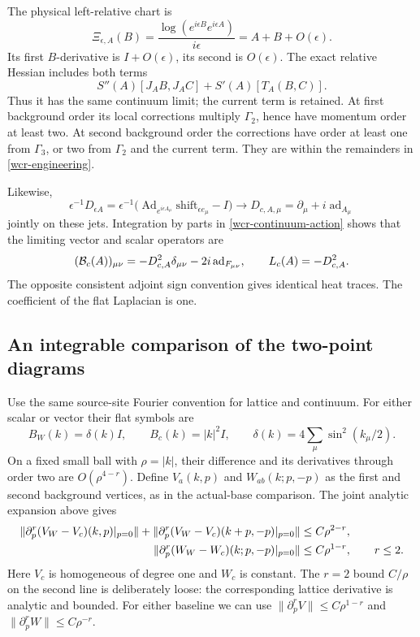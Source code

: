 The physical left-relative chart is
\[
 \Xi_{\epsilon,A}(B)
   =\frac{\log(e^{i\epsilon B}e^{i\epsilon A})}{i\epsilon}
   =A+B+O(\epsilon).
\]
Its first \(B\)-derivative is \(I+O(\epsilon)\), its second is
\(O(\epsilon)\). The exact relative Hessian includes both terms
\[
 S''(A)[J_AB,J_AC]+S'(A)[T_A(B,C)].
\]
Thus it has the same continuum limit; the current term is retained.
At first background order its local corrections multiply
\(\Gamma_2\), hence have momentum order at least two.
At second background order the corrections have order at least one
from \(\Gamma_3\), or two from \(\Gamma_2\) and the current term.
They are within the remainders in \eqref{wcr-engineering}.

Likewise,
\[
 \epsilon^{-1}D_{\epsilon A}
 =\epsilon^{-1}
   \bigl(\operatorname{Ad}_{e^{i\epsilon A_\mu}}
                          \mathrm{shift}_{\epsilon e_\mu}-I\bigr)
 \longrightarrow D_{c,A,\mu}=\partial_\mu+i\operatorname{ad}_{A_\mu}
\]
jointly on these jets. Integration by parts in
\eqref{wcr-continuum-action} shows that the limiting vector and scalar
operators are
\begin{equation}
 ({\cal B}_c(A))_{\mu\nu}
 =-D_{c,A}^2\delta_{\mu\nu}-2i\operatorname{ad}_{F_{\mu\nu}},
 \qquad L_c(A)=-D_{c,A}^2.
 \label{wcr-continuum-operators}
\end{equation}
The opposite consistent adjoint sign convention gives identical heat
traces. The coefficient of the flat Laplacian is one.

\subsection{An integrable comparison of the two-point diagrams}
\label{wcr-comparison-section}

Use the same source-site Fourier convention for lattice and continuum.
For either scalar or vector their flat symbols are
\[
 B_W(k)=\delta(k)I,\qquad B_c(k)=|k|^2I,\qquad
 \delta(k)=4\sum_\mu\sin^2(k_\mu/2).
\]
On a fixed small ball with \(\rho=|k|\), their difference and its
derivatives through order two are \(O(\rho^{4-r})\).
Define \(V_a(k,p)\) and \(W_{ab}(k;p,-p)\) as the first and second
background vertices, as in the actual-base comparison.
The joint analytic expansion above gives
\begin{align}
 \|\partial_p^r(V_W-V_c)(k,p)|_{p=0}\|
 +\|\partial_p^r(V_W-V_c)(k+p,-p)|_{p=0}\|
     &\le C\rho^{2-r},\notag\\
 \|\partial_p^r(W_W-W_c)(k;p,-p)|_{p=0}\|
     &\le C\rho^{1-r},\qquad r\le2.
 \label{wcr-vertex-errors}
\end{align}
Here \(V_c\) is homogeneous of degree one and \(W_c\) is constant.
The \(r=2\) bound \(C/\rho\) on the second line is deliberately loose:
the corresponding lattice derivative is analytic and bounded.
For either baseline we can use
\(\|\partial_p^rV\|\le C\rho^{1-r}\) and
\(\|\partial_p^rW\|\le C\rho^{-r}\).

